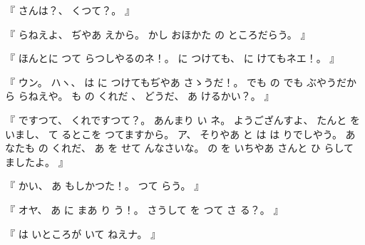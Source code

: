 %
『
さんは？、
%
くつて？。
』

%
『
らねえよ、
%
ぢやあ
えから。
%
かし
おほかた
の
ところだらう。
』

%
『
ほんとに
つて
らつしやるのネ！。
%
に
つけても、
%
に
けてもネエ！。
』

%
『
ウン。
%
ハヽ、
%
は
に
つけてもぢやあ
さゝうだ！。
%
でも
の
でも
ぶやうだから
らねえや。
%
も
の
くれだ
、
%
%
どうだ、
%
あ
けるかい？。
』

%
『
ですつて、
%
くれですつて？。
%
あんまり
い
ネ。
%
ようござんすよ、
%
たんと
を
いまし、
%
て
るとこを
つてますから。
%
ア、
%
そりやあ
と
は
は
りでしやう。
%
あなたも
の
くれだ、
%
あ
を
せて
んなさいな。
%
の
を
いちやあ
さんと
ひ
らして
ましたよ。
』

%
『
かい、
%
あ
もしかつた！。
%
つて
らう。
』

%
『
オヤ、
%
あ
に
まあ
り
う！。
%
さうして
を
つて
さ
る？。
』

%
『
は%
いところが
いて
ねえナ。
』

